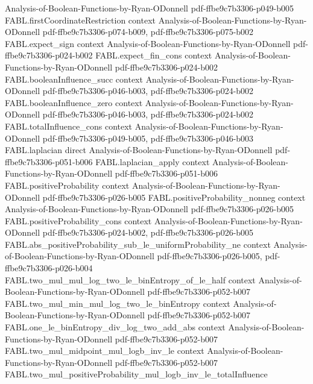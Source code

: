 \begin{theorem}
  {Analysis-of-Boolean-Functions-by-Ryan-ODonnell}
  {pdf-ffbe9c7b3306-p049-b005}
\proofstep
  {FABL.firstCoordinateRestriction}
  {context}
  {Analysis-of-Boolean-Functions-by-Ryan-ODonnell}
  {pdf-ffbe9c7b3306-p074-b009,
    pdf-ffbe9c7b3306-p075-b002}
\proofstep
  {FABL.expect_sign}
  {context}
  {Analysis-of-Boolean-Functions-by-Ryan-ODonnell}
  {pdf-ffbe9c7b3306-p024-b002}
\proofstep
  {FABL.expect_fin_cons}
  {context}
  {Analysis-of-Boolean-Functions-by-Ryan-ODonnell}
  {pdf-ffbe9c7b3306-p024-b002}
\proofstep
  {FABL.booleanInfluence_succ}
  {context}
  {Analysis-of-Boolean-Functions-by-Ryan-ODonnell}
  {pdf-ffbe9c7b3306-p046-b003,
    pdf-ffbe9c7b3306-p024-b002}
\proofstep
  {FABL.booleanInfluence_zero}
  {context}
  {Analysis-of-Boolean-Functions-by-Ryan-ODonnell}
  {pdf-ffbe9c7b3306-p046-b003,
    pdf-ffbe9c7b3306-p024-b002}
\proofstep
  {FABL.totalInfluence_cons}
  {context}
  {Analysis-of-Boolean-Functions-by-Ryan-ODonnell}
  {pdf-ffbe9c7b3306-p049-b005,
    pdf-ffbe9c7b3306-p046-b003}
\proofstep
  {FABL.laplacian}
  {direct}
  {Analysis-of-Boolean-Functions-by-Ryan-ODonnell}
  {pdf-ffbe9c7b3306-p051-b006}
\proofstep
  {FABL.laplacian_apply}
  {context}
  {Analysis-of-Boolean-Functions-by-Ryan-ODonnell}
  {pdf-ffbe9c7b3306-p051-b006}
\proofstep
  {FABL.positiveProbability}
  {context}
  {Analysis-of-Boolean-Functions-by-Ryan-ODonnell}
  {pdf-ffbe9c7b3306-p026-b005}
\proofstep
  {FABL.positiveProbability_nonneg}
  {context}
  {Analysis-of-Boolean-Functions-by-Ryan-ODonnell}
  {pdf-ffbe9c7b3306-p026-b005}
\proofstep
  {FABL.positiveProbability_cons}
  {context}
  {Analysis-of-Boolean-Functions-by-Ryan-ODonnell}
  {pdf-ffbe9c7b3306-p024-b002,
    pdf-ffbe9c7b3306-p026-b005}
\proofstep
  {FABL.abs_positiveProbability_sub_le_uniformProbability_ne}
  {context}
  {Analysis-of-Boolean-Functions-by-Ryan-ODonnell}
  {pdf-ffbe9c7b3306-p026-b005,
    pdf-ffbe9c7b3306-p026-b004}
\proofstep
  {FABL.two_mul_mul_log_two_le_binEntropy_of_le_half}
  {context}
  {Analysis-of-Boolean-Functions-by-Ryan-ODonnell}
  {pdf-ffbe9c7b3306-p052-b007}
\proofstep
  {FABL.two_mul_min_mul_log_two_le_binEntropy}
  {context}
  {Analysis-of-Boolean-Functions-by-Ryan-ODonnell}
  {pdf-ffbe9c7b3306-p052-b007}
\proofstep
  {FABL.one_le_binEntropy_div_log_two_add_abs}
  {context}
  {Analysis-of-Boolean-Functions-by-Ryan-ODonnell}
  {pdf-ffbe9c7b3306-p052-b007}
\proofstep
  {FABL.two_mul_midpoint_mul_logb_inv_le}
  {context}
  {Analysis-of-Boolean-Functions-by-Ryan-ODonnell}
  {pdf-ffbe9c7b3306-p052-b007}
\proofstep
  {FABL.two_mul_positiveProbability_mul_logb_inv_le_totalInfluence}

\end{theorem}
